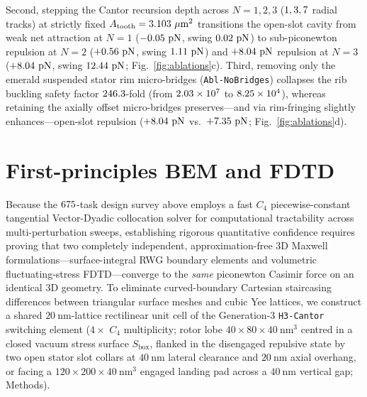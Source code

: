 \documentclass[pdflatex,sn-nature]{sn-jnl}
\DeclareRobustCommand{\roundtwo}[1]{\fpeval{round(#1,2)}}
\begin{document}
Second, stepping the Cantor recursion depth across $N = 1, 2, 3$ ($1{}, 3{}, 7{}$ radial tracks) at strictly fixed $A_{\mathrm{tooth}} = \RobAtoothUmtwoDisp{}\ \mu\mathrm{m}^2$ transitions the open-slot cavity from weak net attraction at $N=1$ ($-0.05{}\ \mathrm{pN}$, swing $\AblDepthNoneSwing{}\ \mathrm{pN}$) to sub-piconewton repulsion at $N=2$ ($+0.56{}\ \mathrm{pN}$, swing $\AblDepthNtwoSwing{}\ \mathrm{pN}$) and $+\roundtwo{\HthreeSymFzOpPn}\ \mathrm{pN}$ repulsion at $N=3$ ($\AblDepthNthreeFzOpen{}\ \mathrm{pN}$, swing $12.44{}\ \mathrm{pN}$; Fig.~\ref{fig:ablations}c). Third, removing only the emerald suspended stator rim micro-bridges (\texttt{Abl-NoBridges}) collapses the rib buckling safety factor $246.3{}$-fold (from $2.03\times 10^{7}{}$ to $8.25\times 10^{4}{}$), whereas retaining the axially offset micro-bridges preserves---and via rim-fringing slightly enhances---open-slot repulsion ($+8.04{}\ \mathrm{pN}$ vs.\ $+7.35{}\ \mathrm{pN}$; Fig.~\ref{fig:ablations}d).

\section*{First-principles BEM and FDTD}
\label{sec:convergence}

Because the $675{}$-task design survey above employs a fast $C_4$ piecewise-constant tangential Vector-Dyadic collocation solver for computational tractability across multi-perturbation sweeps, establishing rigorous quantitative confidence requires proving that two completely independent, approximation-free 3D Maxwell formulations---surface-integral RWG boundary elements and volumetric fluctuating-stress FDTD---converge to the \emph{same} piconewton Casimir force on an identical 3D geometry. To eliminate curved-boundary Cartesian staircasing differences between triangular surface meshes and cubic Yee lattices, we construct a shared $20\ \mathrm{nm}$-lattice rectilinear unit cell of the Generation-3 \texttt{H3-Cantor} switching element ($4\times$ $C_4$ multiplicity; rotor lobe $40 \times 80 \times 40\ \mathrm{nm}^3$ centred in a closed vacuum stress surface $S_{\mathrm{box}}$, flanked in the disengaged repulsive state by two open stator slot collars at $40\ \mathrm{nm}$ lateral clearance and $20\ \mathrm{nm}$ axial overhang, or facing a $120 \times 200 \times 40\ \mathrm{nm}^3$ engaged landing pad across a $40\ \mathrm{nm}$ vertical gap; Methods).
\end{document}

